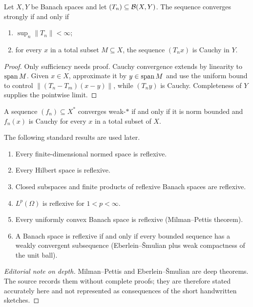 \begin{notetheorem}
Let $X,Y$ be Banach spaces and let $(T_n)\subseteq\mathcal{B}(X,Y)$.  The sequence
converges strongly if and only if
\begin{enumerate}
  \item $\sup_n\|T_n\|<\infty$;
  \item for every $x$ in a total subset $M\subseteq X$, the sequence
        $(T_nx)$ is Cauchy in $Y$.
\end{enumerate}
\end{notetheorem}

\begin{proof}
Only sufficiency needs proof.  Cauchy convergence extends by linearity to
$\operatorname{span} M$.  Given $x\in X$, approximate it by $y\in\operatorname{span} M$ and use the
uniform bound to control
$\|(T_n-T_m)(x-y)\|$, while $(T_ny)$ is Cauchy.  Completeness of $Y$ supplies
the pointwise limit.
\end{proof}

\begin{notecorollary}
A sequence $(f_n)\subseteq X^*$ converges weak-$*$ if and only if it is norm
bounded and $f_n(x)$ is Cauchy for every $x$ in a total subset of $X$.
\end{notecorollary}

\begin{notetheorem}
The following standard results are used later.
\begin{enumerate}
  \item Every finite-dimensional normed space is reflexive.
  \item Every Hilbert space is reflexive.
  \item Closed subspaces and finite products of reflexive Banach spaces are
        reflexive.
  \item $L^p(\Omega)$ is reflexive for $1<p<\infty$.
  \item Every uniformly convex Banach space is reflexive
        (Milman--Pettis theorem).
  \item A Banach space is reflexive if and only if every bounded sequence has
        a weakly convergent subsequence (Eberlein--\v{S}mulian plus weak
        compactness of the unit ball).
\end{enumerate}
\end{notetheorem}

\begin{proof}[Editorial note on depth]
Milman--Pettis and Eberlein--\v{S}mulian are deep theorems.  The source records
them without complete proofs; they are therefore stated accurately here and
not represented as consequences of the short handwritten sketches.
\end{proof}

